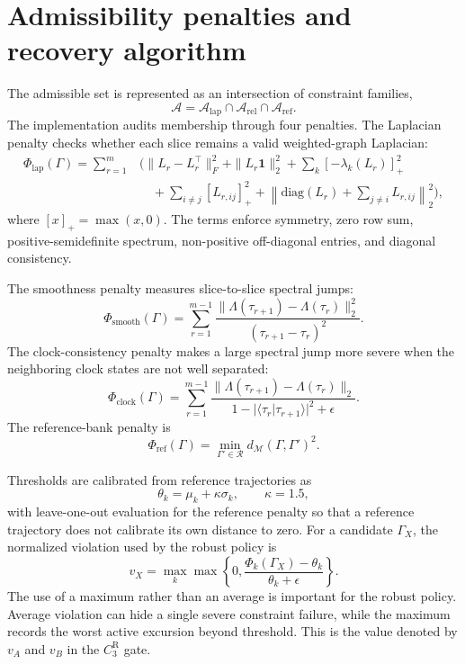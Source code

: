 \documentclass[11pt]{article}
\numberwithin{equation}{section}
\begin{document}
\section{Admissibility penalties and recovery algorithm}

The admissible set is represented as an intersection of constraint families,
\begin{equation}
\mathcal{A}
=
\mathcal{A}_{\mathrm{lap}}
\cap
\mathcal{A}_{\mathrm{rel}}
\cap
\mathcal{A}_{\mathrm{ref}}.
\end{equation}
The implementation audits membership through four penalties. The Laplacian
penalty checks whether each slice remains a valid weighted-graph Laplacian:
\begin{align}
\Phi_{\mathrm{lap}}(\Gamma)
=
\sum_{r=1}^{m}
&
\Big(
\|L_r-L_r^\top\|_F^2
+\|L_r\mathbf 1\|_2^2
+\sum_k[-\lambda_k(L_r)]_+^2
\nonumber\\
&\quad
+\sum_{i\ne j}[L_{r,ij}]_+^2
+\left\|
\mathrm{diag}(L_r)+\sum_{j\ne i}L_{r,ij}
\right\|_2^2
\Big),
\end{align}
where $[x]_+=\max(x,0)$. The terms enforce symmetry, zero row sum,
positive-semidefinite spectrum, non-positive off-diagonal entries, and diagonal
consistency.

The smoothness penalty measures slice-to-slice spectral jumps:
\begin{equation}
\Phi_{\mathrm{smooth}}(\Gamma)
=
\sum_{r=1}^{m-1}
\frac{
\|\Lambda(\tau_{r+1})-\Lambda(\tau_r)\|_2^2
}{
(\tau_{r+1}-\tau_r)^2
}.
\end{equation}
The clock-consistency penalty makes a large spectral jump more severe when the
neighboring clock states are not well separated:
\begin{equation}
\Phi_{\mathrm{clock}}(\Gamma)
=
\sum_{r=1}^{m-1}
\frac{
\|\Lambda(\tau_{r+1})-\Lambda(\tau_r)\|_2
}{
1-|\langle\tau_r|\tau_{r+1}\rangle|^2+\epsilon
}.
\end{equation}
The reference-bank penalty is
\begin{equation}
\Phi_{\mathrm{ref}}(\Gamma)
=
\min_{\Gamma'\in\mathcal R}
d_{\mathcal M}(\Gamma,\Gamma')^2 .
\end{equation}

Thresholds are calibrated from reference trajectories as
\begin{equation}
\theta_k=\mu_k+\kappa\sigma_k,\qquad \kappa=1.5,
\end{equation}
with leave-one-out evaluation for the reference penalty so that a reference
trajectory does not calibrate its own distance to zero. For a candidate
$\Gamma_X$, the normalized violation used by the robust policy is
\begin{equation}
v_X
=
\max_k
\max\left\{0,\frac{\Phi_k(\Gamma_X)-\theta_k}{\theta_k+\epsilon}\right\}.
\end{equation}
The use of a maximum rather than an average is important for the robust policy.
Average violation can hide a single severe constraint failure, while the maximum
records the worst active excursion beyond threshold. This is the value denoted by
$v_A$ and $v_B$ in the $C_3^{\mathrm R}$ gate.
\end{document}
